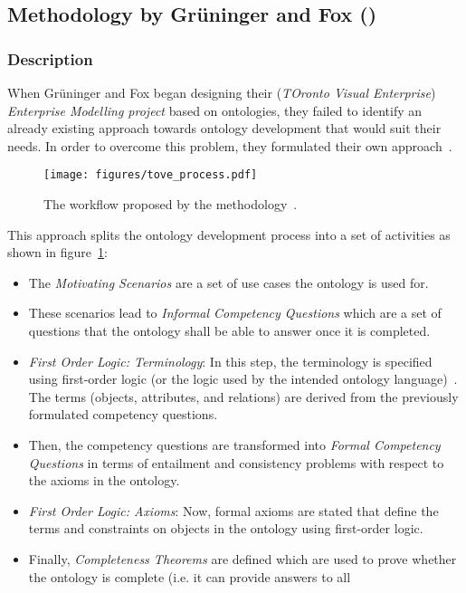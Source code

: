 \subsection{Methodology by Grüninger and Fox ()}
\label{subsec:approach4}

\subsubsection{Description}

When Grüninger and Fox began designing their  (\emph{TOronto Visual Enterprise}) \emph{Enterprise Modelling project} based on ontologies, they failed to identify an already existing approach towards ontology development that would suit their needs. In order to overcome this problem, they formulated their own approach~\cite{GruningerFox}.

\begin{figure}
\centering
\texttt{[image: figures/tove\_process.pdf]}
\caption{The workflow proposed by the  methodology~\cite{GruningerFox}.}
\label{fig:tove_process}
\end{figure}


This approach splits the ontology development process into a set of activities as shown in figure~\ref{fig:tove_process}:

\begin{itemize}
  \item The \emph{Motivating Scenarios} are a set of use cases the ontology is used for.
  \item These scenarios lead to \emph{Informal Competency Questions} which are a set of questions that the ontology shall be able to answer once it is completed.
  \item \emph{First Order Logic: Terminology}: In this step, the terminology is specified using first-order logic (or the logic used by the intended ontology language)~\cite{FirstOrderLogic}. The terms (objects, attributes, and relations) are derived from the previously formulated competency questions.
  \item Then, the competency questions are transformed into \emph{Formal Competency Questions} in terms of entailment and consistency problems with respect to the axioms in the ontology.
  \item \emph{First Order Logic: Axioms}: Now, formal axioms are stated that define the terms and constraints on objects in the ontology using first-order logic.
  \item Finally, \emph{Completeness Theorems} are defined which are used to prove whether the ontology is complete (i.e. it can provide answers to all %
\end{itemize}

